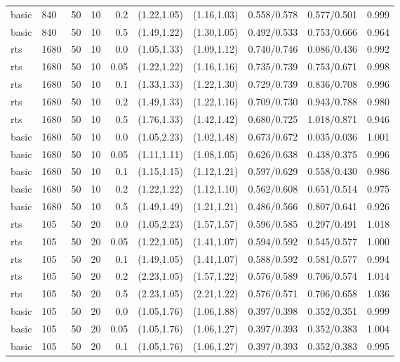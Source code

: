 \begin{tabular}{llrrrccccc}
basic & 840 & 50 & 10 & 0.2 & (1.22,1.05) & (1.16,1.03) & 0.558/0.578 & 0.577/0.501 & 0.999 \\
basic & 840 & 50 & 10 & 0.5 & (1.49,1.22) & (1.30,1.05) & 0.492/0.533 & 0.753/0.666 & 0.964 \\
rts & 1680 & 50 & 10 & 0.0 & (1.05,1.33) & (1.09,1.12) & 0.740/0.746 & 0.086/0.436 & 0.992 \\
rts & 1680 & 50 & 10 & 0.05 & (1.22,1.22) & (1.16,1.16) & 0.735/0.739 & 0.753/0.671 & 0.998 \\
rts & 1680 & 50 & 10 & 0.1 & (1.33,1.33) & (1.22,1.30) & 0.729/0.739 & 0.836/0.708 & 0.996 \\
rts & 1680 & 50 & 10 & 0.2 & (1.49,1.33) & (1.22,1.16) & 0.709/0.730 & 0.943/0.788 & 0.980 \\
rts & 1680 & 50 & 10 & 0.5 & (1.76,1.33) & (1.42,1.42) & 0.680/0.725 & 1.018/0.871 & 0.946 \\
basic & 1680 & 50 & 10 & 0.0 & (1.05,2.23) & (1.02,1.48) & 0.673/0.672 & 0.035/0.036 & 1.001 \\
basic & 1680 & 50 & 10 & 0.05 & (1.11,1.11) & (1.08,1.05) & 0.626/0.638 & 0.438/0.375 & 0.996 \\
basic & 1680 & 50 & 10 & 0.1 & (1.15,1.15) & (1.12,1.21) & 0.597/0.629 & 0.558/0.430 & 0.986 \\
basic & 1680 & 50 & 10 & 0.2 & (1.22,1.22) & (1.12,1.10) & 0.562/0.608 & 0.651/0.514 & 0.975 \\
basic & 1680 & 50 & 10 & 0.5 & (1.49,1.49) & (1.21,1.21) & 0.486/0.566 & 0.807/0.641 & 0.926 \\
rts & 105 & 50 & 20 & 0.0 & (1.05,2.23) & (1.57,1.57) & 0.596/0.585 & 0.297/0.491 & 1.018 \\
rts & 105 & 50 & 20 & 0.05 & (1.22,1.05) & (1.41,1.07) & 0.594/0.592 & 0.545/0.577 & 1.000 \\
rts & 105 & 50 & 20 & 0.1 & (1.49,1.05) & (1.41,1.07) & 0.588/0.592 & 0.581/0.577 & 0.994 \\
rts & 105 & 50 & 20 & 0.2 & (2.23,1.05) & (1.57,1.22) & 0.576/0.589 & 0.706/0.574 & 1.014 \\
rts & 105 & 50 & 20 & 0.5 & (2.23,1.05) & (2.21,1.22) & 0.576/0.571 & 0.706/0.658 & 1.036 \\
basic & 105 & 50 & 20 & 0.0 & (1.05,1.76) & (1.06,1.88) & 0.397/0.398 & 0.352/0.351 & 0.999 \\
basic & 105 & 50 & 20 & 0.05 & (1.05,1.76) & (1.06,1.27) & 0.397/0.393 & 0.352/0.383 & 1.004 \\
basic & 105 & 50 & 20 & 0.1 & (1.05,1.76) & (1.06,1.27) & 0.397/0.393 & 0.352/0.383 & 0.995 \\

\end{tabular}
